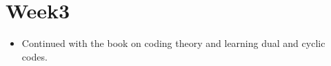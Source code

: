 \section{Week3}
\begin{itemize}
    \item Continued with the book on coding theory and learning dual and cyclic codes.
\end{itemize}